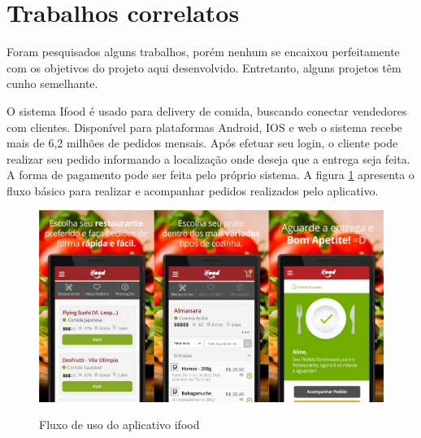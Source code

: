 \section{Trabalhos correlatos}
\label{sec:java}

Foram pesquisados alguns trabalhos, porém nenhum se encaixou perfeitamente com os objetivos do projeto aqui desenvolvido. Entretanto, alguns projetos têm cunho semelhante. \par
O sistema Ifood é usado para delivery de comida, buscando conectar vendedores com clientes. Disponível para plataformas Android, IOS e web o sistema recebe mais de 6,2 milhões de pedidos mensais\cite{bastos2018marketing}. Após efetuar seu login, o cliente pode realizar seu pedido informando a localização onde deseja que a entrega seja feita. A forma de pagamento pode ser feita pelo próprio sistema. A figura \ref{fig:ifood} apresenta o fluxo básico para realizar e acompanhar pedidos realizados pelo aplicativo.

\pagebreak
\begin{figure}[htbp!]
  \centering
  \caption{Fluxo de uso do aplicativo ifood}
  \includegraphics[width=1\textwidth]{figs/ifood2.jpg}
    \label{fig:ifood}
\end{figure}